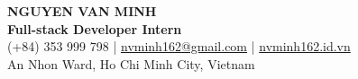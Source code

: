 \begin{center}
    {\fontsize{25}{28}\selectfont\bfseries NGUYEN VAN MINH}\\[4pt]
    {\large\bfseries Full-stack Developer Intern}\\[6pt]
    (+84) 353 999 798 \;|\; \href{mailto:nvminh162@gmail.com}{nvminh162@gmail.com} \;|\; \href{https://nvminh162.id.vn}{nvminh162.id.vn}\\[3pt]
    An Nhon Ward, Ho Chi Minh City, Vietnam
    \\ \vspace{-1pt}
\end{center}
